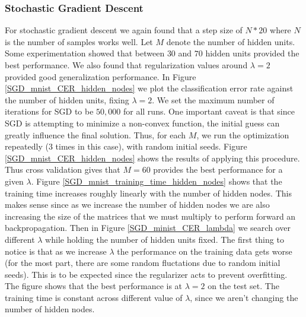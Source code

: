 \documentclass[10pt]{article}
\begin{document}
\subsubsection*{Stochastic Gradient Descent}
For stochastic gradient descent we again found that a step size of $N*20$ where $N$ is the number of samples works well. Let $M$ denote the number of hidden units. Some experimentation showed that between $30$ and $70$ hidden units provided the best performance. We also found that regularization values around $\lambda = 2$ provided good generalization performance. In Figure \ref{SGD_mnist_CER_hidden_nodes} we plot the classification error rate against the number of hidden units, fixing $\lambda = 2$. We set the maximum number of iterations for SGD to be $50,000$ for all runs. One important caveat is that since SGD is attempting to minimize a non-convex function, the initial guess can greatly influence the final solution. Thus, for each $M$, we run the optimization repeatedly (3 times in this case), with random initial seeds. Figure \ref{SGD_mnist_CER_hidden_nodes} shows the results of applying this procedure. Thus cross validation gives that $M = 60$ provides the best performance for a given $\lambda$. Figure \ref{SGD_mnist_training_time_hidden_nodes} shows that the training time increases roughly linearly with the number of hidden nodes. This makes sense since as we increase the number of hidden nodes we are also increasing the size of the matrices that we must multiply to perform forward an backpropagation. Then in Figure \ref{SGD_minist_CER_lambda} we search over different $\lambda$ while holding the number of hidden units fixed. The first thing to notice is that as we increase $\lambda$ the performance on the training data gets worse (for the most part, there are some random fluctations due to random initial seeds). This is to be expected since the regularizer acts to prevent overfitting. The figure shows that the best performance is at $\lambda = 2$ on the test set. The training time is constant across different value of $\lambda$, since we aren't changing the number of hidden nodes.
\end{document}
